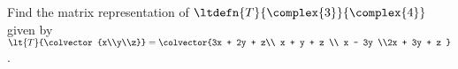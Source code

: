 Find the matrix representation of $\ltdefn{T}{\complex{3}}{\complex{4}}$ given by 
$\lt{T}{\colvector{x\\y\\z}} = \colvector{3x + 2y + z\\ x + y + z \\ x - 3y \\2x + 3y + z }$.